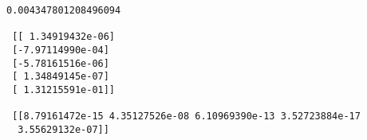 \documentclass[11pt]{article}
\makeatletter
\newcommand{\boxspacing}{\kern\kvtcb@left@rule\kern\kvtcb@boxsep}
\newcommand{\prompt}[4]{
        {\ttfamily\llap{{\color{#2}[#3]:\hspace{3pt}#4}}\vspace{-\baselineskip}}
    }
\makeatother
\begin{document}
    \begin{Verbatim}[commandchars=\\\{\}]
0.004347801208496094

 [[ 1.34919432e-06]
 [-7.97114990e-04]
 [-5.78161516e-06]
 [ 1.34849145e-07]
 [ 1.31215591e-01]]

 [[8.79161472e-15 4.35127526e-08 6.10969390e-13 3.52723884e-17
  3.55629132e-07]]
    \end{Verbatim}

    \begin{tcolorbox}[breakable, size=fbox, boxrule=1pt, pad at break*=1mm,colback=cellbackground, colframe=cellborder]
\prompt{In}{incolor}{ }{\boxspacing}
\begin{Verbatim}[commandchars=\\\{\}]

\end{Verbatim}
\end{tcolorbox}


    
    
    
\end{document}
